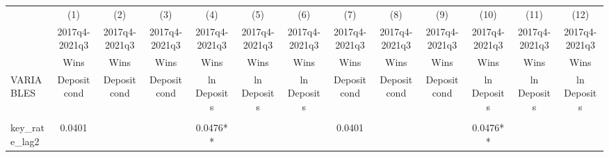 \documentclass[]{article}
\begin{document}
\begin{center}
\begin{tabular}{lcccccccccccc} \hline
 & (1) & (2) & (3) & (4) & (5) & (6) & (7) & (8) & (9) & (10) & (11) & (12) \\
 & 2017q4-2021q3 & 2017q4-2021q3 & 2017q4-2021q3 & 2017q4-2021q3 & 2017q4-2021q3 & 2017q4-2021q3 & 2017q4-2021q3 & 2017q4-2021q3 & 2017q4-2021q3 & 2017q4-2021q3 & 2017q4-2021q3 & 2017q4-2021q3 \\
 & Wins & Wins & Wins & Wins & Wins & Wins & Wins & Wins & Wins & Wins & Wins & Wins \\
VARIABLES & Deposit cond & Deposit cond & Deposit cond & ln Deposits & ln Deposits & ln Deposits & Deposit cond & Deposit cond & Deposit cond & ln Deposits & ln Deposits & ln Deposits \\ \hline
\vspace{4pt} & \begin{footnotesize}\end{footnotesize} & \begin{footnotesize}\end{footnotesize} & \begin{footnotesize}\end{footnotesize} & \begin{footnotesize}\end{footnotesize} & \begin{footnotesize}\end{footnotesize} & \begin{footnotesize}\end{footnotesize} & \begin{footnotesize}\end{footnotesize} & \begin{footnotesize}\end{footnotesize} & \begin{footnotesize}\end{footnotesize} & \begin{footnotesize}\end{footnotesize} & \begin{footnotesize}\end{footnotesize} & \begin{footnotesize}\end{footnotesize} \\
key\_rate\_lag2 & 0.0401 &  &  & 0.0476** &  &  & 0.0401 &  &  & 0.0476** &  &  \\

\end{tabular}
\end{center}
\end{document}

